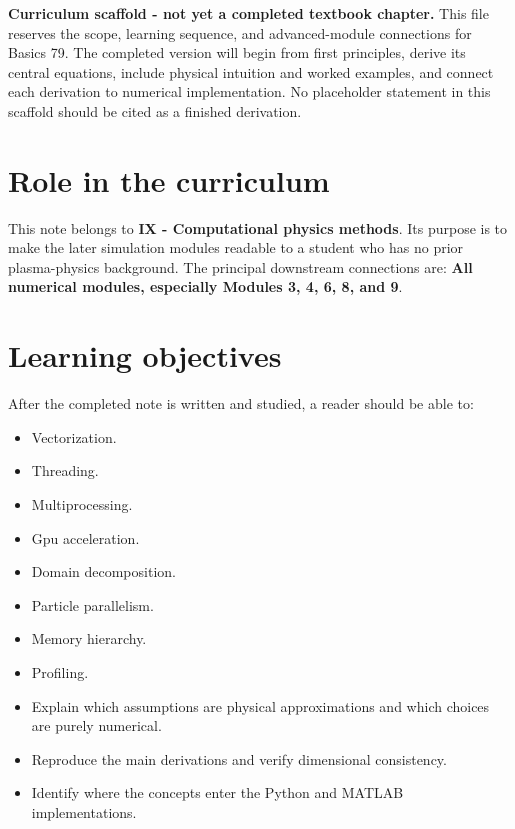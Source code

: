 \documentclass[11pt]{article}
\begin{document}

\begin{overviewbox}
\textbf{Curriculum scaffold - not yet a completed textbook chapter.} This file reserves the scope, learning sequence, and advanced-module connections for Basics 79. The completed version will begin from first principles, derive its central equations, include physical intuition and worked examples, and connect each derivation to numerical implementation. No placeholder statement in this scaffold should be cited as a finished derivation.
\end{overviewbox}

\ProjectTOC

\section{Role in the curriculum}
This note belongs to \textbf{IX - Computational physics methods}. Its purpose is to make the later simulation modules readable to a student who has no prior plasma-physics background. The principal downstream connections are: \textbf{All numerical modules, especially Modules 3, 4, 6, 8, and 9}.

\section{Learning objectives}
After the completed note is written and studied, a reader should be able to:
\begin{itemize}[leftmargin=1.6em]
\item Vectorization.
\item Threading.
\item Multiprocessing.
\item Gpu acceleration.
\item Domain decomposition.
\item Particle parallelism.
\item Memory hierarchy.
\item Profiling.
\item Explain which assumptions are physical approximations and which choices are purely numerical.
\item Reproduce the main derivations and verify dimensional consistency.
\item Identify where the concepts enter the Python and MATLAB implementations.
\end{itemize}
\end{document}

